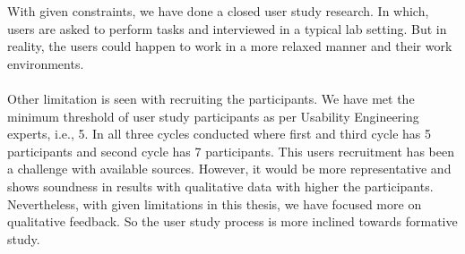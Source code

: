 With given constraints, we have done a closed user study research. In which, users are asked to perform tasks and interviewed in a typical lab setting. But in reality, the users could happen to work in a more relaxed manner and their work environments. \\ \\

Other limitation is seen with recruiting the participants. We have met the minimum threshold of user study participants as per Usability Engineering experts, i.e., 5. In all three cycles conducted where first and third cycle has 5 participants and second cycle has 7 participants. This users recruitment has been a challenge with available sources. However, it would be more representative and shows soundness in results with qualitative data with higher the participants. Nevertheless, with given limitations in this thesis, we have focused more on qualitative feedback. So the user study process is more inclined towards formative study. \\ \\
